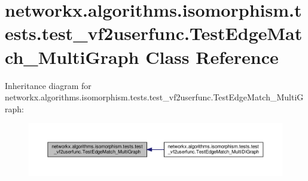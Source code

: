 \hypertarget{classnetworkx_1_1algorithms_1_1isomorphism_1_1tests_1_1test__vf2userfunc_1_1TestEdgeMatch__MultiGraph}{}\section{networkx.\+algorithms.\+isomorphism.\+tests.\+test\+\_\+vf2userfunc.\+Test\+Edge\+Match\+\_\+\+Multi\+Graph Class Reference}
\label{classnetworkx_1_1algorithms_1_1isomorphism_1_1tests_1_1test__vf2userfunc_1_1TestEdgeMatch__MultiGraph}


Inheritance diagram for networkx.\+algorithms.\+isomorphism.\+tests.\+test\+\_\+vf2userfunc.\+Test\+Edge\+Match\+\_\+\+Multi\+Graph\+:
\nopagebreak
\begin{figure}[H]
\begin{center}
\leavevmode
\includegraphics[width=350pt]{classnetworkx_1_1algorithms_1_1isomorphism_1_1tests_1_1test__vf2userfunc_1_1TestEdgeMatch__MultiGraph__inherit__graph}
\end{center}
\end{figure}
